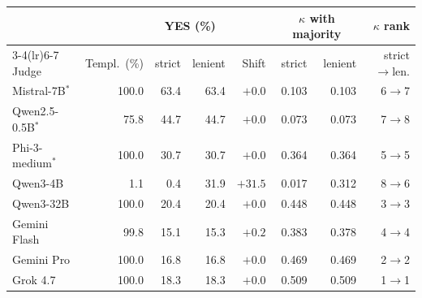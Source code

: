 \begin{tabular}{@{}lrrrrrrr@{}}
\toprule
 & & \multicolumn{2}{c}{YES (\%)} & & \multicolumn{2}{c}{$\kappa$ with majority} & $\kappa$ rank \\
\cmidrule(lr){3-4}\cmidrule(lr){6-7}
Judge & Templ.\ (\%) & strict & lenient & Shift & strict & lenient & strict$\to$len. \\
\midrule
Mistral-7B$^\ast$ & 100.0 & 63.4 & 63.4 & $+0.0$ & 0.103 & 0.103 & 6$\to$7 \\
Qwen2.5-0.5B$^\ast$ & 75.8 & 44.7 & 44.7 & $+0.0$ & 0.073 & 0.073 & 7$\to$8 \\
Phi-3-medium$^\ast$ & 100.0 & 30.7 & 30.7 & $+0.0$ & 0.364 & 0.364 & 5$\to$5 \\
Qwen3-4B & 1.1 & 0.4 & 31.9 & $+31.5$ & 0.017 & 0.312 & 8$\to$6 \\
Qwen3-32B & 100.0 & 20.4 & 20.4 & $+0.0$ & 0.448 & 0.448 & 3$\to$3 \\
Gemini Flash & 99.8 & 15.1 & 15.3 & $+0.2$ & 0.383 & 0.378 & 4$\to$4 \\
Gemini Pro & 100.0 & 16.8 & 16.8 & $+0.0$ & 0.469 & 0.469 & 2$\to$2 \\
Grok 4.7 & 100.0 & 18.3 & 18.3 & $+0.0$ & 0.509 & 0.509 & 1$\to$1 \\
\bottomrule
\end{tabular}
